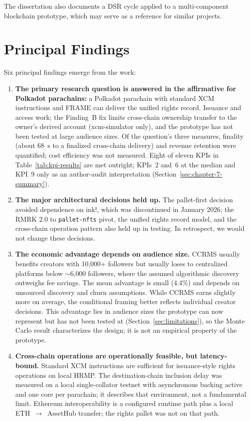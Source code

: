 The dissertation also documents a DSR cycle applied to a multi-component blockchain prototype, which may serve as a reference for similar projects.

\section{Principal Findings}\label{sec:principal-findings}

Six principal findings emerge from the work:

\begin{enumerate}
\item \textbf{The primary research question is answered in the affirmative for Polkadot parachains:} a Polkadot parachain with standard XCM instructions and FRAME can deliver the unified rights record. Issuance and access work; the Finding~B fix limits cross-chain ownership transfer to the owner's derived account (xcm-simulator only), and the prototype has not been tested at large audience sizes. Of the question's three measures, finality (about 68~s to a finalized cross-chain delivery) and revenue retention were quantified; cost efficiency was not measured. Eight of eleven KPIs in Table~\ref{tab:kpi-results} are met outright; KPIs~2 and~6 at the median and KPI~9 only as an author-audit interpretation (Section~\ref{sec:chapter-7-summary}).
\item \textbf{The major architectural decisions held up.} The pallet-first decision avoided dependence on ink!, which was discontinued in January 2026; the RMRK 2.0 to \texttt{pallet-nfts} pivot, the unified rights record model, and the cross-chain operation pattern also held up in testing. In retrospect, we would not change these decisions.
\item \textbf{The economic advantage depends on audience size.} CCRMS usually benefits creators with 10,000+ followers but usually loses to centralized platforms below $\sim$6,000 followers, where the assumed algorithmic discovery outweighs fee savings. The mean advantage is small (4.4\%) and depends on unsourced discovery and churn assumptions. While CCRMS earns slightly more on average, the conditional framing better reflects individual creator decisions. This advantage lies in audience sizes the prototype can now represent but has not been tested at (Section~\ref{sec:limitations}), so the Monte Carlo result characterizes the design; it is not an empirical property of the prototype.
\item \textbf{Cross-chain operations are operationally feasible, but latency-bound.} Standard XCM instructions are sufficient for issuance-style rights operations on local HRMP. The destination-chain inclusion delay was measured on a local single-collator testnet with asynchronous backing active and one core per parachain; it describes that environment, not a fundamental limit. Ethereum interoperability is a configured runtime path plus a local ETH~$\to$~AssetHub transfer; the rights pallet was not on that path.

\end{enumerate}
